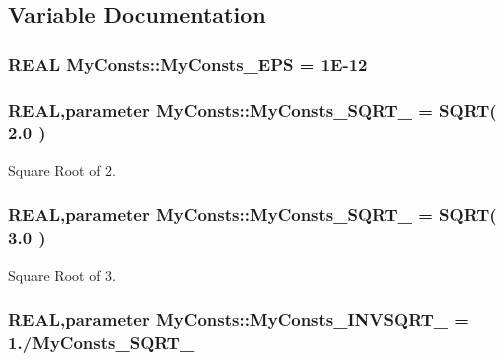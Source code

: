 \subsection{Variable Documentation}
\hypertarget{namespace_my_consts_a16f360c5da46572d6fb585806a1df519}{
\subsubsection[{MyConsts\_\-EPS}]{\setlength{\rightskip}{0pt plus 5cm}REAL {\bf MyConsts::MyConsts\_\-EPS} = 1E-\/12}}
\label{namespace_my_consts_a16f360c5da46572d6fb585806a1df519}
\hypertarget{namespace_my_consts_a6e68542f43fce6ab1f7e252239b4a25b}{
\subsubsection[{MyConsts\_\-SQRT\_\-2}]{\setlength{\rightskip}{0pt plus 5cm}REAL,parameter {\bf MyConsts::MyConsts\_\-SQRT\_} = SQRT( 2.0 )}}
\label{namespace_my_consts_a6e68542f43fce6ab1f7e252239b4a25b}


Square Root of 2. \hypertarget{namespace_my_consts_a929edc066c350d2da103fc05a425cf82}{
\subsubsection[{MyConsts\_\-SQRT\_\-3}]{\setlength{\rightskip}{0pt plus 5cm}REAL,parameter {\bf MyConsts::MyConsts\_\-SQRT\_} = SQRT( 3.0 )}}
\label{namespace_my_consts_a929edc066c350d2da103fc05a425cf82}


Square Root of 3. \hypertarget{namespace_my_consts_af9c57a57cecb201806c7ab5d3095ee96}{
\subsubsection[{MyConsts\_\-INVSQRT\_\-3}]{\setlength{\rightskip}{0pt plus 5cm}REAL,parameter {\bf MyConsts::MyConsts\_\-INVSQRT\_} = 1./{\bf MyConsts\_\-SQRT\_}}}
\label{namespace_my_consts_af9c57a57cecb201806c7ab5d3095ee96}


